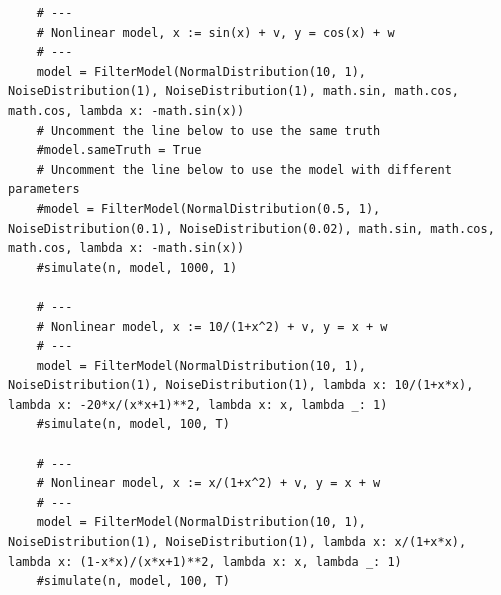 \documentclass[paper=a4, fontsize=11pt]{scrartcl} %
\numberwithin{equation}{section} %
\numberwithin{figure}{section} %
\numberwithin{table}{section} %
\begin{document}
\begin{lstlisting}
    # ---
    # Nonlinear model, x := sin(x) + v, y = cos(x) + w
    # ---
    model = FilterModel(NormalDistribution(10, 1), NoiseDistribution(1), NoiseDistribution(1), math.sin, math.cos, math.cos, lambda x: -math.sin(x))
    # Uncomment the line below to use the same truth
    #model.sameTruth = True
    # Uncomment the line below to use the model with different parameters
    #model = FilterModel(NormalDistribution(0.5, 1), NoiseDistribution(0.1), NoiseDistribution(0.02), math.sin, math.cos, math.cos, lambda x: -math.sin(x))
    #simulate(n, model, 1000, 1)

    # ---
    # Nonlinear model, x := 10/(1+x^2) + v, y = x + w
    # ---
    model = FilterModel(NormalDistribution(10, 1), NoiseDistribution(1), NoiseDistribution(1), lambda x: 10/(1+x*x), lambda x: -20*x/(x*x+1)**2, lambda x: x, lambda _: 1)
    #simulate(n, model, 100, T)

    # ---
    # Nonlinear model, x := x/(1+x^2) + v, y = x + w
    # ---
    model = FilterModel(NormalDistribution(10, 1), NoiseDistribution(1), NoiseDistribution(1), lambda x: x/(1+x*x), lambda x: (1-x*x)/(x*x+1)**2, lambda x: x, lambda _: 1)
    #simulate(n, model, 100, T)


\end{lstlisting}
\end{document}

